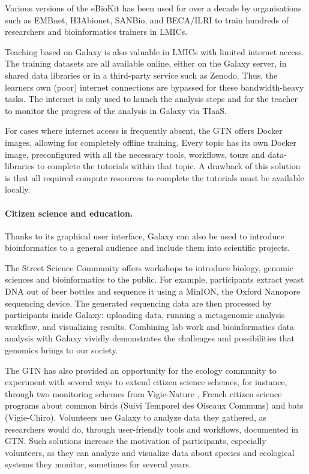 Various versions of the eBioKit has been used for over a decade by organisations such as EMBnet, H3Abionet, SANBio, and BECA/ILRI to train hundreds of researchers and bioinformatics trainers in LMICs.

Teaching based on Galaxy is also valuable in LMICs with limited internet access. The training datasets are all available online, either on the Galaxy server, in shared data libraries or in a third-party service such as Zenodo. Thus, the learners own (poor) internet connections are bypassed for these bandwidth-heavy tasks. The internet is only used to launch the analysis steps and for the teacher to monitor the progress of the analysis in Galaxy via TIaaS.

For cases where internet access is frequently absent, the GTN offers Docker \cite{Boettiger2015} images, allowing for completely offline training. Every topic has its own Docker image, preconfigured with all the necessary tools, workflows, tours and data-libraries to complete the tutorials within that topic. A drawback of this solution is that all required compute resources to complete the tutorials must be available locally. 

\paragraph{Citizen science and education.}
Thanks to its graphical user interface, Galaxy can also be used to introduce bioinformatics to a general audience and include them into scientific projects.

The Street Science Community \cite{street-science-community} offers workshops to introduce biology, genomic sciences and bioinformatics to the public. For example, participants extract yeast DNA out of beer bottles and sequence it using a MinION, the Oxford Nanopore sequencing device. The generated sequencing data are then processed by participants inside Galaxy: uploading data, running a metagenomic analysis workflow, and visualizing results. Combining lab work and bioinformatics data analysis with Galaxy vividly demonstrates the challenges and possibilities that genomics brings to our society.

The GTN has also provided an opportunity for the ecology community to experiment with several ways to extend citizen science schemes, for instance, through two monitoring schemes from Vigie-Nature \cite{vigienature}, French citizen science programs about common birds (Suivi Temporel des Oiseaux Communs) and bats (Vigie-Chiro). Volunteers use Galaxy to analyze data they gathered, as researchers would do, through user-friendly tools and workflows, documented in GTN. Such solutions increase the motivation of participants, especially volunteers, as they can analyze and visualize data about species and ecological systems they monitor, sometimes for several years.

